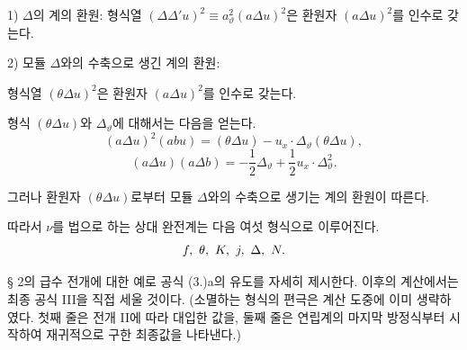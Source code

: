 1) $\Delta$의 계의 환원: 형식열 $(\Delta\Delta' u)^2\equiv a_\vartheta^2(a\Delta u)^2$은 환원자 $(a\Delta u)^2$를 인수로 갖는다.

2) 모듈 $\Delta$와의 수축으로 생긴 계의 환원:

형식열 $(\theta\Delta u)^2$은 환원자 $(a\Delta u)^2$를 인수로 갖는다.

형식 $(\theta\Delta u)$와 $\Delta_\vartheta$에 대해서는 다음을 얻는다.
\[
(a\Delta u)^2(abu)=(\theta\Delta u)-u_x\cdot\Delta_\vartheta(\theta\Delta u),
\]
\[
(a\Delta u)(a\Delta b)=-\frac12\Delta_\vartheta+\frac12u_x\cdot\Delta_\vartheta^2.
\]

그러나 환원자 $(\theta\Delta u)$로부터 모듈 $\Delta$와의 수축으로 생기는 계의 환원이 따른다.

\bigskip

따라서 $\nu$를 법으로 하는 상대 완전계는 다음 여섯 형식으로 이루어진다.
\[
f,\ \theta,\ K,\ j,\ \Delta,\ N.
\]

§ 2의 급수 전개에 대한 예로 공식 (3.)a의 유도를 자세히 제시한다. 이후의 계산에서는 최종 공식 III을 직접 세울 것이다. (소멸하는 형식의 편극은 계산 도중에 이미 생략하였다. 첫째 줄은 전개 II에 따라 대입한 값을, 둘째 줄은 연립계의 마지막 방정식부터 시작하여 재귀적으로 구한 최종값을 나타낸다.)

